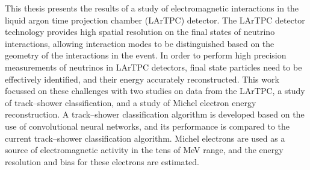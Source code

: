 This thesis presents the results of a study of electromagnetic interactions in 
the \protodune{} liquid argon time projection chamber (LArTPC) detector. The 
LArTPC detector technology provides high spatial resolution on the final states 
of neutrino interactions, allowing interaction modes to be distinguished based 
on the geometry of the interactions in the event. In order to perform high
precision measurements of neutrinos in LArTPC detectors, final state particles
need to be effectively identified, and their energy accurately reconstructed.
This work focussed on these challenges with two studies on data from the
\protodune{} LArTPC, a study of track--shower classification, and a study of 
Michel electron energy reconstruction. A track--shower classification algorithm
is developed based on the use of convolutional neural networks, and its
performance is compared to the current track--shower classification algorithm.
Michel electrons are used as a source of electromagnetic activity in the tens of
MeV range, and the energy resolution and bias for these electrons are estimated.

% 
% 
% 
% 
% 
% 
